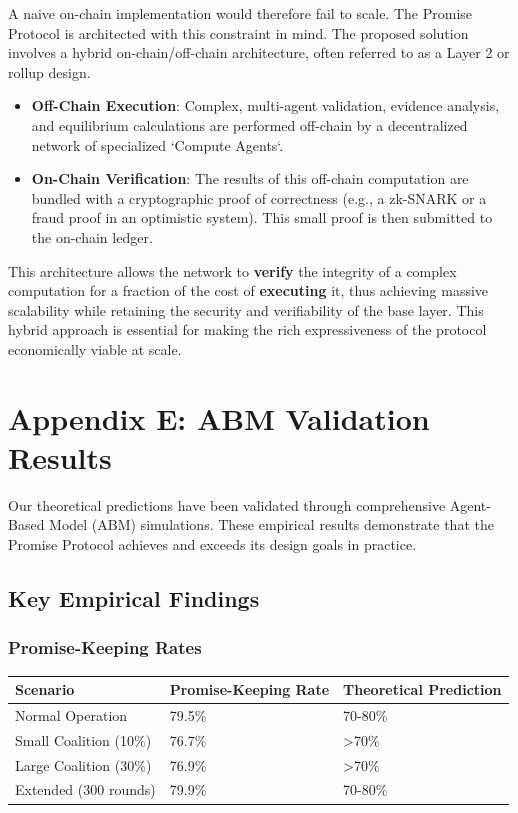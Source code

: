 \documentclass[11pt]{article}
\begin{document}
A naive on-chain implementation would therefore fail to scale. The Promise Protocol is architected with this constraint in mind. The proposed solution involves a hybrid on-chain/off-chain architecture, often referred to as a Layer 2 or rollup design.
\begin{itemize}
\item \textbf{Off-Chain Execution}: Complex, multi-agent validation, evidence analysis, and equilibrium calculations are performed off-chain by a decentralized network of specialized `Compute Agents`.
\item \textbf{On-Chain Verification}: The results of this off-chain computation are bundled with a cryptographic proof of correctness (e.g., a zk-SNARK or a fraud proof in an optimistic system). This small proof is then submitted to the on-chain ledger.
\end{itemize}
This architecture allows the network to \textbf{verify} the integrity of a complex computation for a fraction of the cost of \textbf{executing} it, thus achieving massive scalability while retaining the security and verifiability of the base layer. This hybrid approach is essential for making the rich expressiveness of the protocol economically viable at scale.
\section{Appendix E: ABM Validation Results}
\label{sec:org9aa0252}

Our theoretical predictions have been validated through comprehensive Agent-Based Model (ABM) simulations. These empirical results demonstrate that the Promise Protocol achieves and exceeds its design goals in practice.
\subsection{Key Empirical Findings}
\label{sec:orgba7dca7}

\subsubsection{Promise-Keeping Rates}
\label{sec:orgad4b87c}
\begin{center}
\begin{tabular}{lll}
Scenario & Promise-Keeping Rate & Theoretical Prediction\\
\hline
Normal Operation & 79.5\% & 70-80\%\\
Small Coalition (10\%) & 76.7\% & >70\%\\
Large Coalition (30\%) & 76.9\% & >70\%\\
Extended (300 rounds) & 79.9\% & 70-80\%\\
\end{tabular}
\end{center}
\end{document}
